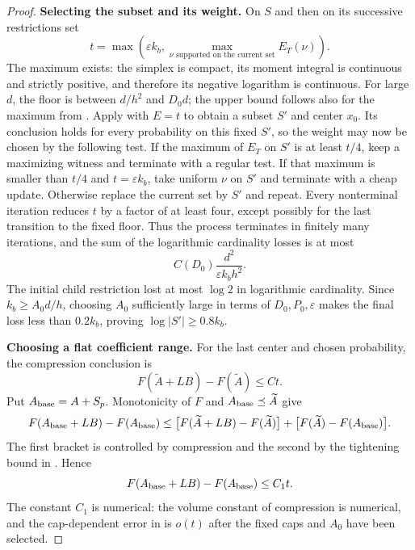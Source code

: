 \begin{proof}
\textbf{Selecting the subset and its weight.}
On $S$ and then on its successive restrictions set
\[
 t=\max\left(\varepsilon k_b,
                 \max_{\nu\text{ supported on the current set}}E_T(\nu)
       \right).
\]
The maximum exists: the simplex is compact, its moment integral is
continuous and strictly positive, and therefore its negative logarithm
is continuous.  For large $d$, the floor is between $d/h^2$ and $D_0d$;
the upper bound follows also for the maximum from
.  Apply  with
$E=t$ to obtain a subset $S'$ and center $x_0$. Its conclusion holds
for every probability on this fixed $S'$, so the weight may now be chosen
by the following test.
If the maximum of $E_T$ on $S'$ is at least $t/4$, keep a maximizing
witness and terminate with a regular test.  If that maximum is smaller
than $t/4$ and $t=\varepsilon k_b$, take uniform $\nu$ on $S'$ and
terminate with a cheap update.  Otherwise replace the current set by
$S'$ and repeat.  Every nonterminal iteration reduces $t$ by a factor
of at least four, except possibly for the last transition to the fixed
floor.  Thus the process terminates in finitely many iterations, and
the sum of the logarithmic cardinality losses is at most
\[
 C(D_0)\frac{d^2}{\varepsilon k_bh^2}.
\]
The initial child restriction lost at most $\log2$ in logarithmic
cardinality.  Since $k_b\ge A_0d/h$, choosing $A_0$ sufficiently large
in terms of $D_0,P_0,\varepsilon$ makes the final loss less than
$0.2k_b$, proving $\log|S'|\ge0.8k_b$.

\textbf{Choosing a flat coefficient range.}
For the last center and chosen probability, the compression conclusion
is
\[
 F(\widetilde A+LB)-F(\widetilde A)\le Ct.
\]
Put $A_{\rm base}=A+S_p$. Monotonicity of $F$ and
$A_{\rm base}\preceq\widetilde A$ give
\[
 F(A_{\rm base}+LB)-F(A_{\rm base})
 \le \bigl[F(\widetilde A+LB)-F(\widetilde A)\bigr]
       +\bigl[F(\widetilde A)-F(A_{\rm base})\bigr].
\]
The first bracket is controlled by compression and the second by the
tightening bound in . Hence
\begin{equation}\label{eq:thermal-volume-cost}
 F(A_{\rm base}+LB)-F(A_{\rm base})\le C_1t.
\end{equation}
The constant $C_1$ is numerical: the volume constant of compression is
numerical, and the cap-dependent error in  is $o(t)$
after the fixed caps and $A_0$ have been selected.


\end{proof}
